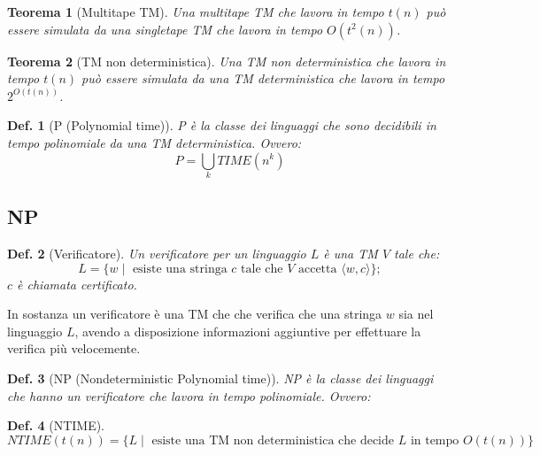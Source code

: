 \documentclass[11pt]{article}
\newtheorem{definition}{Def.}[section]
\newtheorem{theorem}{Teorema}[section]
\begin{document}
\begin{theorem}[Multitape TM]
	Una multitape TM che lavora in tempo $t(n)$ può essere simulata da una
	singletape TM che lavora in tempo $O(t^2(n))$.
\end{theorem}

\begin{theorem}[TM non deterministica]
	Una TM non deterministica che lavora in tempo $t(n)$ può essere simulata da
	una TM deterministica che lavora in tempo $2^{O(t(n))}$.
\end{theorem}

\begin{definition}[P (Polynomial time)]
	P è la classe dei linguaggi che sono decidibili in tempo polinomiale da una
	TM deterministica. Ovvero:
	\begin{equation}
		P = \bigcup_k TIME(n^k)
	\end{equation}
\end{definition}

\subsection{NP}

\begin{definition}[Verificatore]
	Un verificatore per un linguaggio $L$ è una TM $V$ tale che:
	\begin{equation}
		L = \{w \mid \text{ esiste una stringa } c \text{ tale che } V
			\text{ accetta } \langle w, c \rangle\};
	\end{equation}
	$c$ è chiamata certificato.
\end{definition}

In sostanza un verificatore è una TM che che verifica che una stringa $w$ sia
nel linguaggio $L$, avendo a disposizione informazioni aggiuntive per effettuare
la verifica più velocemente.

\begin{definition}[NP (Nondeterministic Polynomial time)]
	NP è la classe dei linguaggi che hanno un verificatore che lavora in tempo
	polinomiale. Ovvero:
\end{definition}

\begin{definition}[NTIME]
	\begin{equation}
		NTIME(t(n)) = \{L \mid \text{ esiste una TM non deterministica che
		decide $L$ in tempo $O(t(n))$}\}
	\end{equation}
\end{definition}
\end{document}

